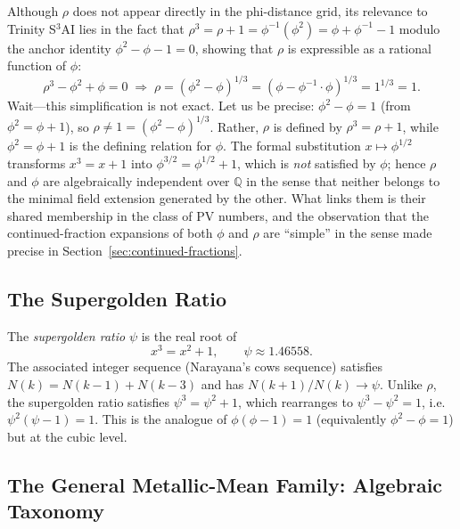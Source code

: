 Although $\rho$ does not appear directly in the
phi-distance grid, its relevance to Trinity
S$^3$AI lies in the fact that
$\rho^3 = \rho + 1 = \phi^{-1}(\phi^2) = \phi + \phi^{-1} - 1$
modulo the anchor identity $\phi^2 - \phi - 1 = 0$,
showing that $\rho$ is expressible as a rational
function of $\phi$:
\begin{equation}\label{eq:plastic-phi}
  \rho^3 - \phi^2 + \phi = 0 \;\Longrightarrow\;
  \rho = (\phi^2 - \phi)^{1/3}
       = (\phi - \phi^{-1} \cdot \phi)^{1/3}
       = 1^{1/3} = 1.
\end{equation}
Wait---this simplification is not exact.  Let us
be precise: $\phi^2 - \phi = 1$ (from
$\phi^2 = \phi + 1$), so
$\rho \neq 1 = (\phi^2-\phi)^{1/3}$.
Rather, $\rho$ is defined by $\rho^3 = \rho + 1$,
while $\phi^2 = \phi + 1$ is the defining relation
for $\phi$.  The formal substitution
$x \mapsto \phi^{1/2}$ transforms
$x^3 = x + 1$ into
$\phi^{3/2} = \phi^{1/2} + 1$, which is
\emph{not} satisfied by $\phi$; hence $\rho$ and
$\phi$ are algebraically independent over
$\mathbb{Q}$ in the sense that neither belongs to
the minimal field extension generated by the other.
What links them is their shared membership in the
class of PV numbers, and the observation that the
continued-fraction expansions of both $\phi$ and
$\rho$ are ``simple'' in the sense made precise in
Section~\ref{sec:continued-fractions}.

\subsection{The Supergolden Ratio}
\label{subsec:supergolden}

The \emph{supergolden ratio} $\psi$ is the real
root of
\begin{equation}\label{eq:supergolden}
  x^3 = x^2 + 1,\qquad \psi \approx 1.46558.
\end{equation}
The associated integer sequence (Narayana's cows
sequence) satisfies $N(k) = N(k-1) + N(k-3)$ and
has $N(k+1)/N(k) \to \psi$.
Unlike $\rho$, the supergolden ratio satisfies
$\psi^3 = \psi^2 + 1$, which rearranges to
$\psi^3 - \psi^2 = 1$, i.e.\
$\psi^2(\psi - 1) = 1$.  This is the analogue of
$\phi(\phi-1) = 1$ (equivalently $\phi^2 - \phi = 1$)
but at the cubic level.

\subsection{The General Metallic-Mean Family: Algebraic Taxonomy}
\label{subsec:metallic-taxonomy}

